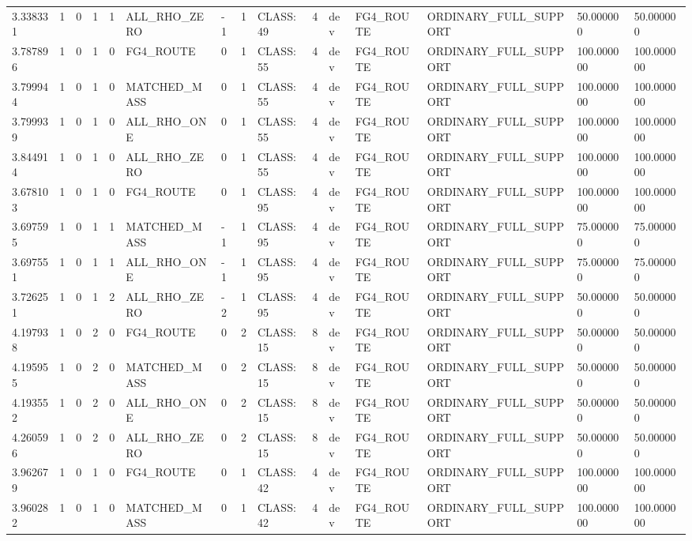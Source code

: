 \begin{tabular}{lllllllllllllll}
3.338331 & 1 & 0 & 1 & 1 & ALL\_RHO\_ZERO & -1 & 1 & CLASS:49 & 4 & dev & FG4\_ROUTE & ORDINARY\_FULL\_SUPPORT & 50.000000 & 50.000000 \\
3.787896 & 1 & 0 & 1 & 0 & FG4\_ROUTE & 0 & 1 & CLASS:55 & 4 & dev & FG4\_ROUTE & ORDINARY\_FULL\_SUPPORT & 100.000000 & 100.000000 \\
3.799944 & 1 & 0 & 1 & 0 & MATCHED\_MASS & 0 & 1 & CLASS:55 & 4 & dev & FG4\_ROUTE & ORDINARY\_FULL\_SUPPORT & 100.000000 & 100.000000 \\
3.799939 & 1 & 0 & 1 & 0 & ALL\_RHO\_ONE & 0 & 1 & CLASS:55 & 4 & dev & FG4\_ROUTE & ORDINARY\_FULL\_SUPPORT & 100.000000 & 100.000000 \\
3.844914 & 1 & 0 & 1 & 0 & ALL\_RHO\_ZERO & 0 & 1 & CLASS:55 & 4 & dev & FG4\_ROUTE & ORDINARY\_FULL\_SUPPORT & 100.000000 & 100.000000 \\
3.678103 & 1 & 0 & 1 & 0 & FG4\_ROUTE & 0 & 1 & CLASS:95 & 4 & dev & FG4\_ROUTE & ORDINARY\_FULL\_SUPPORT & 100.000000 & 100.000000 \\
3.697595 & 1 & 0 & 1 & 1 & MATCHED\_MASS & -1 & 1 & CLASS:95 & 4 & dev & FG4\_ROUTE & ORDINARY\_FULL\_SUPPORT & 75.000000 & 75.000000 \\
3.697551 & 1 & 0 & 1 & 1 & ALL\_RHO\_ONE & -1 & 1 & CLASS:95 & 4 & dev & FG4\_ROUTE & ORDINARY\_FULL\_SUPPORT & 75.000000 & 75.000000 \\
3.726251 & 1 & 0 & 1 & 2 & ALL\_RHO\_ZERO & -2 & 1 & CLASS:95 & 4 & dev & FG4\_ROUTE & ORDINARY\_FULL\_SUPPORT & 50.000000 & 50.000000 \\
4.197938 & 1 & 0 & 2 & 0 & FG4\_ROUTE & 0 & 2 & CLASS:15 & 8 & dev & FG4\_ROUTE & ORDINARY\_FULL\_SUPPORT & 50.000000 & 50.000000 \\
4.195955 & 1 & 0 & 2 & 0 & MATCHED\_MASS & 0 & 2 & CLASS:15 & 8 & dev & FG4\_ROUTE & ORDINARY\_FULL\_SUPPORT & 50.000000 & 50.000000 \\
4.193552 & 1 & 0 & 2 & 0 & ALL\_RHO\_ONE & 0 & 2 & CLASS:15 & 8 & dev & FG4\_ROUTE & ORDINARY\_FULL\_SUPPORT & 50.000000 & 50.000000 \\
4.260596 & 1 & 0 & 2 & 0 & ALL\_RHO\_ZERO & 0 & 2 & CLASS:15 & 8 & dev & FG4\_ROUTE & ORDINARY\_FULL\_SUPPORT & 50.000000 & 50.000000 \\
3.962679 & 1 & 0 & 1 & 0 & FG4\_ROUTE & 0 & 1 & CLASS:42 & 4 & dev & FG4\_ROUTE & ORDINARY\_FULL\_SUPPORT & 100.000000 & 100.000000 \\
3.960282 & 1 & 0 & 1 & 0 & MATCHED\_MASS & 0 & 1 & CLASS:42 & 4 & dev & FG4\_ROUTE & ORDINARY\_FULL\_SUPPORT & 100.000000 & 100.000000 \\

\end{tabular}
